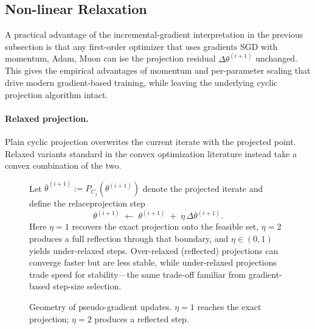 \documentclass{article}
\theoremstyle{plain}
\theoremstyle{definition}
\theoremstyle{remark}
\begin{document}
\subsection{Non-linear Relaxation}
\label{sec:relaxation}
A practical advantage of the incremental-gradient interpretation in the previous subsection is that any first-order optimizer that uses gradients SGD with momentum, Adam, Muon can ise the projection residual $\Delta\theta^{(i+1)}$ unchanged. This gives the empirical advantages of momentum and per-parameter scaling that drive modern gradient-based training, while leaving the underlying cyclic projection algorithm intact.

\paragraph{Relaxed projection.}
Plain cyclic projection overwrites the current iterate with the projected point. Relaxed variants standard in the convex optimization literature instead take a convex combination of the two. 

\begin{figure}[htbp]
    \centering
    \begin{minipage}[t]{0.56\textwidth}
        \vspace{-90pt}
        Let $\bar{\theta}^{(i+1)} := P_{C_j}(\theta^{(i+1)})$ denote the projected iterate and define the relaceprojection step       
        \begin{equation}
                    \theta^{(i+1)} \;\gets\; \theta^{(i+1)} \;+\; \eta\,\Delta\theta^{(i+1)}.
            \label{eq:eta_relaxed_projection}
        \end{equation}
        Here $\eta = 1$ recovers the exact projection onto the feasible set, $\eta = 2$ produces a full reflection through that boundary, and $\eta \in (0, 1)$ yields under-relaxed steps. Over-relaxed (reflected) projections can converge faster but are less stable, while under-relaxed projections trade speed for stability---the same trade-off familiar from gradient-based step-size selection. 
    \end{minipage}
    \hfill
    \begin{minipage}[t]{0.40\textwidth}
        \centering
        \resizebox{\textwidth}{!}{%
            
        }
        \caption{Geometry of pseudo-gradient updates. $\eta = 1$ reaches the exact projection; $\eta = 2$ produces a reflected step.}
        \label{fig:pseudogradient-reflection-geometry}
    \end{minipage}
\end{figure}
\end{document}
